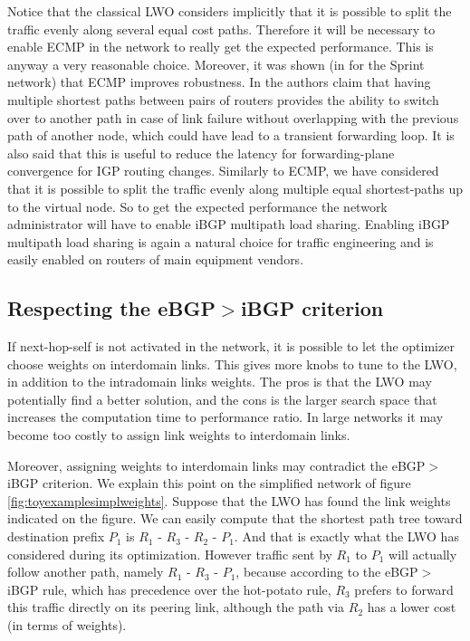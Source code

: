 \documentclass{acm_proc_article-sp}
\begin{document}
Notice that the classical LWO considers implicitly that it is 
possible to split the traffic evenly along several equal cost paths.
Therefore it will be necessary to enable ECMP in the network to really
get the expected performance. This is anyway a very reasonable choice.
Moreover, it was shown (in \cite{diot} for the Sprint network)
that ECMP improves robustness. In \cite{diot2} the authors claim that
having multiple shortest paths between pairs of routers provides the
ability to switch over to another path in case of link failure without
overlapping with the previous path of another node, which could have lead
to a transient forwarding loop. It is also said that this is useful
to reduce the latency for forwarding-plane convergence for IGP
routing changes. Similarly to ECMP, we have considered that it is possible to split the traffic
evenly along multiple equal shortest-paths up to the virtual node.
So to get the expected performance the network administrator will have to enable
iBGP multipath load sharing. 
Enabling iBGP multipath load sharing is again a natural choice for traffic engineering and is
easily enabled on routers of main equipment vendors.

\subsection{Respecting the eBGP$>$iBGP criterion}
\label{sec:ebgpibgp}

If next-hop-self is not activated in the network, it is possible to
let the optimizer choose weights on interdomain links. This gives
more knobs to tune to the LWO, in addition to the intradomain links
weights. The pros is that the LWO may potentially find a better
solution, and the cons is the larger search space that increases the
computation time to performance ratio. In large networks it may become
too costly to assign link weights to interdomain links. 

Moreover, assigning weights to interdomain links may contradict 
the eBGP$>$iBGP criterion. We explain this point on
the simplified network of figure \ref{fig:toyexamplesimplweights}.
Suppose that the LWO has found the
link weights indicated on the figure. We can easily compute that
the shortest path tree toward destination prefix $P_1$ is $R_1$ - $R_3$ - $R_2$ -
$P_1$. And that is exactly what the LWO has considered during its optimization.
However traffic sent by $R_1$ to $P_1$ will actually follow another path, namely 
$R_1$ - $R_3$ - $P_1$, because according to the eBGP$>$iBGP rule,
which has precedence over the hot-potato rule,
$R_3$ prefers to forward this traffic directly on 
its peering link, although the path via $R_2$ has a lower cost (in terms of weights).
\end{document}
